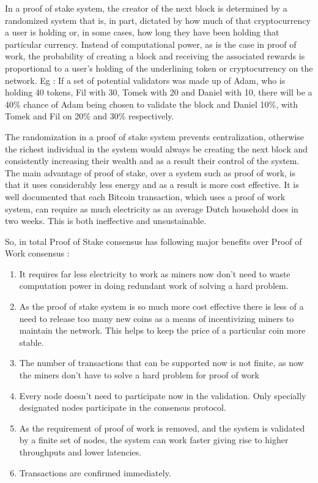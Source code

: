 In a proof of stake system, the creator of the next block is determined by a randomized system that is, in part, dictated by how much of that cryptocurrency a user is holding or, in some cases, how long they have been holding that particular currency. Instead of computational power, as is the case in proof of work, the probability of creating a block and receiving the associated rewards is proportional to a user’s holding of the underlining token or cryptocurrency on the network. Eg : If a set of potential validators was made up of Adam, who is holding 40 tokens, Fil with 30, Tomek with 20 and Daniel with 10, there will be a 40\% chance of Adam being chosen to validate the block and Daniel 10\%, with Tomek and Fil on 20\% and 30\% respectively.

The randomization in a proof of stake system prevents centralization, otherwise the richest individual in the system would always be creating the next block and consistently increasing their wealth and as a result their control of the system. The main advantage of proof of stake, over a system such as proof of work, is that it uses considerably less energy and as a result is more cost effective. It is well documented that each Bitcoin transaction, which uses a proof of work system, can require as much electricity as an average Dutch household does in two weeks. This is both ineffective and unsustainable.

So, in total Proof of Stake consensus has following major benefits over Proof of Work consensus :

\begin{enumerate}
    \item It requires far less electricity to work as miners now don't need to waste computation power in doing redundant work of solving a hard problem.
    \item As the proof of stake system is so much more cost effective there is less of a need to release too many new coins as a means of incentivizing miners to maintain the network. This helps to keep the price of a particular coin more stable.
    \item The number of transactions that can be supported now is not finite, as now the miners don't have to solve a hard problem for proof of work
    \item Every node doesn't need to participate now in the validation. Only specially designated nodes participate in the consensus protocol.
    \item As the requirement of proof of work is removed, and the system is validated by a finite set of nodes, the system can work faster giving rise to higher throughputs and lower latencies. 
    \item Transactions are confirmed immediately.
\end{enumerate}

